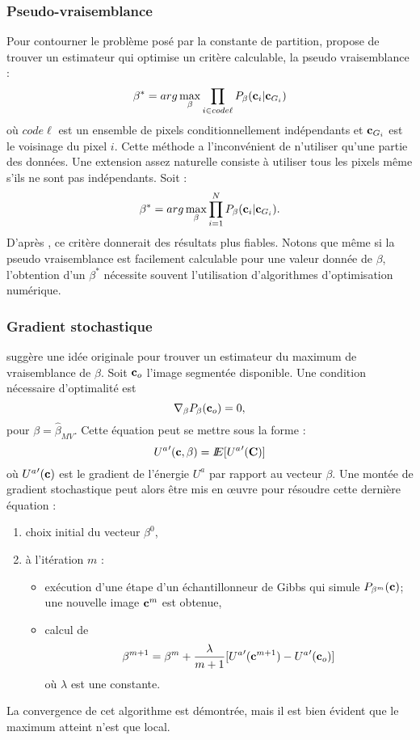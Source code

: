 \subsubsection{Pseudo-vraisemblance}

Pour contourner le probl\`eme pos\'e par la constante de
partition,  propose 
de trouver un estimateur qui optimise un  crit\`ere calculable,
la pseudo vraisemblance :
\[
\beta^*=arg \max_{\beta} \prod_{i \in code \ell} P_{\beta}(\mbox{\bf c}_i |\mbox{\bf c}_{G_i})
\]
o\`u $code \ell$ est un ensemble de pixels conditionnellement ind\'ependants et
$\mbox{\bf c}_{G_i}$ est le voisinage du pixel $i$. Cette m\'ethode a l'inconv\'enient
de n'utiliser qu'une partie des donn\'ees. Une extension assez naturelle
consiste \`a utiliser tous les pixels m\^eme s'ils ne sont pas ind\'ependants. Soit :
\[
\beta^*=arg \max_{\beta} \prod_{i=1}^N P_{\beta}(\mbox{\bf c}_i | \mbox{\bf c}_{G_i}).
\]
D'apr\`es , ce crit\`ere donnerait des r\'esultats
plus fiables. Notons que m\^eme si la pseudo vraisemblance est facilement
calculable pour une valeur donn\'ee de $\beta$, l'obtention d'un $\beta^*$
n\'ecessite souvent l'utilisation d'algorithmes d'optimisation num\'erique.

\subsubsection{Gradient stochastique}

 sugg\`ere une id\'ee originale pour trouver un
estimateur du maximum de vraisemblance de $\beta$. Soit $\mbox{\bf c}_o$ l'image
segment\'ee disponible. Une condition n\'ecessaire d'optimalit\'e est 
\[
\nabla_{\beta} P_{\beta}(\mbox{\bf c}_o)=0,
\]
pour $\beta=\hat{\beta}_{MV}$. Cette \'equation peut se mettre sous
la forme :
\[
{U^a}'(\mbox{\bf c},\beta)=I\!\!E[{U^a}'(\mbox{\bf C})]
\] 
o\`u ${U^a}'(\mbox{\bf c})$ est le gradient de l'\'energie $U^a$ par rapport au
vecteur $\beta$. Une mont\'ee de gradient stochastique peut alors
\^etre mis en \oe uvre pour r\'esoudre cette derni\`ere \'equation :
\begin{enumerate}
\item choix initial du vecteur $\beta^0$,
\item \`a l'it\'eration $m$ : 
\begin{itemize}
\item 
ex\'ecution d'une \'etape d'un \'echantillonneur de Gibbs qui simule
$P_{\beta^m}(\mbox{\bf c})$; une nouvelle image $\mbox{\bf c}^m$ est obtenue,
\item calcul de 
\[
\beta^{m+1}=\beta^m + \frac{\lambda}{m+1}[{U^a}'(\mbox{\bf c}^{m+1})-{U^a}'(\mbox{\bf c}_o)]
\]
o\`u $\lambda$ est une constante. 
\end{itemize}
\end{enumerate} 
La convergence de cet algorithme est d\'emontr\'ee,
mais il est bien \'evident que le maximum atteint n'est que local.



